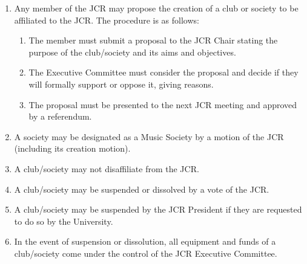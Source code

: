 \documentclass[12pt]{article}
\begin{document}
\begin{enumerate}
    \item Any member of the JCR may propose the creation of a club or society to be affiliated to the JCR. The procedure is as follows:
    \begin{enumerate}
        \item The member must submit a proposal to the JCR Chair stating the purpose of the club/society and its aims and objectives.
        \item The Executive Committee must consider the proposal and decide if they will formally support or oppose it, giving reasons.
        \item The proposal must be presented to the next JCR meeting and approved by a referendum.
    \end{enumerate}
    \item A society may be designated as a Music Society by a motion of the JCR (including its creation motion).
    \item A club/society may not disaffiliate from the JCR.
    \item A club/society may be suspended or dissolved by a vote of the JCR.
    \item A club/society may be suspended by the JCR President if they are requested to do so by the University.
    \item In the event of suspension or dissolution, all equipment and funds of a club/society come under the control of the JCR Executive Committee.
\end{enumerate}
\newpage
\end{document}
